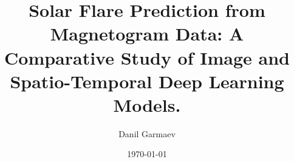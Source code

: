 \documentclass[12pt,twoside,maitrise]{dms}
\numberwithin{equation}{section}
\numberwithin{table}{chapter}
\numberwithin{figure}{chapter}
\begin{document}



\title{Solar Flare Prediction from Magnetogram Data: A Comparative Study of Image and Spatio-Temporal Deep Learning Models.}

\author{Danil Garmaev}



\date{\today} %










\end{document}
